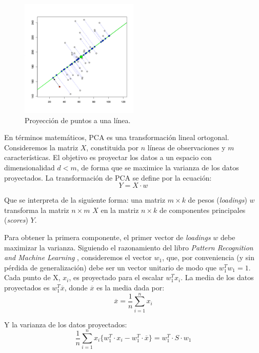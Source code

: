 \documentclass[11pt,spanish,listoffigures,listoftables]{tfgetsinf}
\begin{document}
    \begin{figure}[h]
        \centering
        \includegraphics[width=0.5\textwidth]{ProjectionPCA.jpg}
        \caption{Proyección de puntos a una línea.}
        \label{fig:pca_projection}
    \end{figure}    
    
   En términos matemáticos, PCA es una transformación lineal ortogonal. Consideremos la matriz \(X\), constituida por \(n\) líneas de observaciones y \(m\) características. El objetivo es proyectar los datos a un espacio con dimensionalidad \(d < m\), de forma que se maximice la varianza de los datos proyectados. La transformación de PCA se define por la ecuación:
   \begin{equation}
   Y = X \cdot w
   \end{equation}
   
   Que se interpreta de la siguiente forma: una matriz \(m \times k\) de pesos ({\em loadings}) \(w\) transforma la matriz \(n \times m\) \(X\) en la matriz \(n \times k\) de componentes principales ({\em scores}) \(Y\).

   Para obtener la primera componente, el primer vector de {\em loadings} \(w\) debe maximizar la varianza. Siguiendo el razonamiento del libro \textit{Pattern Recognition and Machine Learning} \cite{bishop}, consideremos el vector \(w_{1}\), que, por conveniencia (y sin pérdida de generalización) debe ser un vector unitario de modo que \(w_{1}^{T}w_{1}=1\). Cada punto de X, \(x_{i}\), es proyectado para el escalar \(w_{1}^{T}x_{i}\). La media de los datos proyectados es \(w_{1}^{T} \overline{x}\), donde \(\overline{x}\) es la media dada por:
   \begin{equation}
   \overline{x} = \frac{1}{n}\sum_{i=1}^{n}x_{i}
   \end{equation}
   
   Y la varianza de los datos proyectados:
   \begin{equation}
   \frac{1}{n}\sum_{i=1}^{n}x_{i}\big\{w_{1}^{T}\cdot x_{i}-w_{1}^{T}\cdot \overline{x}\big\} = w_{1}^{T}\cdot S\cdot w_{1}
   \end{equation}
   
\end{document}
